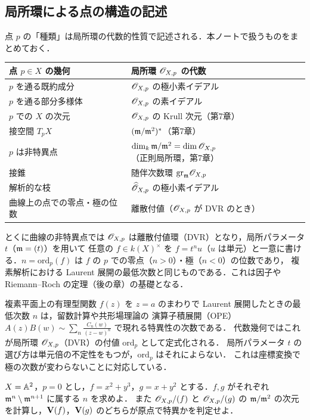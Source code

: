 \subsection{局所環による点の構造の記述}

点 $p$ の「種類」は局所環の代数的性質で記述される．本ノートで扱うものをまとめておく．

\begin{center}
\renewcommand{\arraystretch}{1.35}
\begin{tabular}{l|l}
点 $p\in X$ の幾何 & 局所環 $\mathscr{O}_{X,p}$ の代数\\ \hline
$p$ を通る既約成分 & $\mathscr{O}_{X,p}$ の極小素イデアル\\
$p$ を通る部分多様体 & $\mathscr{O}_{X,p}$ の素イデアル\\
$p$ での $X$ の次元 & $\mathscr{O}_{X,p}$ の Krull 次元（第7章）\\
接空間 $T_pX$ & $(\mathfrak{m}/\mathfrak{m}^2)^*$（第7章）\\
$p$ は非特異点 & $\dim_k\mathfrak{m}/\mathfrak{m}^2=\dim\mathscr{O}_{X,p}$（正則局所環，第7章）\\
接錐 & 随伴次数環 $\mathrm{gr}_{\mathfrak{m}}\mathscr{O}_{X,p}$\\
解析的な枝 & $\widehat{\mathscr{O}}_{X,p}$ の極小素イデアル\\
曲線上の点での零点・極の位数 & 離散付値（$\mathscr{O}_{X,p}$ が DVR のとき）
\end{tabular}
\end{center}

とくに曲線の非特異点では $\mathscr{O}_{X,p}$ は離散付値環（DVR）となり，局所パラメータ $t$（$\mathfrak{m}=(t)$）を用いて
任意の $f\in k(X)^\times$ を $f=t^nu$（$u$ は単元）と一意に書ける．$n=\mathrm{ord}_p(f)$ は $f$ の $p$ での零点（$n>0$）・極（$n<0$）の位数であり，
複素解析における Laurent 展開の最低次数と同じものである．これは因子や Riemann--Roch の定理（後の章）の基礎となる．

\begin{physbox}
複素平面上の有理型関数 $f(z)$ を $z=a$ のまわりで Laurent 展開したときの最低次数 $n$ は，留数計算や共形場理論の
演算子積展開（OPE）$A(z)B(w)\sim\sum_n\frac{C_n(w)}{(z-w)^n}$ で現れる特異性の次数である．
代数幾何ではこれが局所環 $\mathscr{O}_{X,p}$（DVR）の付値 $\mathrm{ord}_p$ として定式化される．
局所パラメータ $t$ の選び方は単元倍の不定性をもつが，$\mathrm{ord}_p$ はそれによらない．
これは座標変換で極の次数が変わらないことに対応している．
\end{physbox}

$X=\mathbb{A}^2$，$p=0$ とし，$f=x^2+y^3$，$g=x+y^2$ とする．$f,g$ がそれぞれ $\mathfrak{m}^n\setminus\mathfrak{m}^{n+1}$ に属する $n$ を求めよ．
また $\mathscr{O}_{X,p}/(f)$ と $\mathscr{O}_{X,p}/(g)$ の $\mathfrak{m}/\mathfrak{m}^2$ の次元を計算し，$\mathbf{V}(f)$，$\mathbf{V}(g)$ のどちらが原点で特異かを判定せよ．

